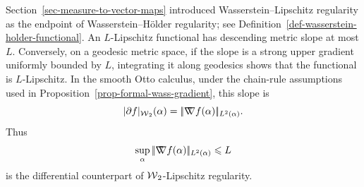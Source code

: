 \begin{rem}\label{rem-w2-lipschitz-bounded-gradient}
	Section~\ref{sec-measure-to-vector-maps} introduced Wasserstein--Lipschitz regularity as the endpoint of Wasserstein--H\"older regularity; see Definition~\ref{def-wasserstein-holder-functional}. An \(L\)-Lipschitz functional has descending metric slope at most \(L\). Conversely, on a geodesic metric space, if the slope is a strong upper gradient uniformly bounded by \(L\), integrating it along geodesics shows that the functional is \(L\)-Lipschitz. In the smooth Otto calculus, under the chain-rule assumptions used in Proposition~\ref{prop-formal-wass-gradient}, this slope is
	\[
		|\partial f|_{\operatorname{\mathcal{W}}_2}(\alpha)
		=
		|\!| \mathord{\nabla\mkern-9.3mu\nabla} f(\alpha) |\!|_{L^2(\alpha)}.
	\]
	Thus
	\[
		\sup_{\alpha}|\!| \mathord{\nabla\mkern-9.3mu\nabla} f(\alpha) |\!|_{L^2(\alpha)}\leqslant L
	\]
	is the differential counterpart of \(\operatorname{\mathcal{W}}_2\)-Lipschitz regularity.
\end{rem}

